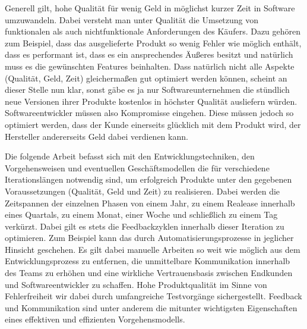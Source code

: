 Generell gilt, hohe Qualität für wenig Geld in möglichst kurzer Zeit in
Software umzuwandeln. Dabei versteht man unter Qualität die Umsetzung von
funktionalen als auch nichtfunktionale Anforderungen des Käufers. Dazu gehören
zum Beispiel, dass das ausgelieferte Produkt so wenig Fehler wie möglich
enthält, dass es performant ist, dass es ein ansprechendes Äußeres besitzt und
natürlich muss es die gewünschten Features beinhalten. Dass natürlich nicht
alle Aspekte (Qualität, Geld, Zeit) gleichermaßen gut optimiert werden können,
scheint an dieser Stelle nun klar, sonst gäbe es ja nur Softwareunternehmen
die stündlich neue Versionen ihrer Produkte kostenlos in höchster Qualität
ausliefern würden. Softwareentwickler müssen also Kompromisse eingehen. Diese
müssen jedoch so optimiert werden, dass der Kunde einerseits glücklich mit dem
Produkt wird, der Hersteller andererseits Geld dabei verdienen kann.

Die folgende Arbeit befasst sich mit den Entwicklungstechniken, den
Vorgehensweisen und eventuellen Geschäftsmodellen die für verschiedene
Iterationslängen notwendig sind, um erfolgreich Produkte unter den gegebenen
Voraussetzungen (Qualität, Geld und Zeit) zu realisieren. Dabei werden die
Zeitspannen der einzelnen Phasen von einem Jahr, zu einem Realease innerhalb
eines Quartals, zu einem Monat, einer Woche und schließlich zu einem Tag
verkürzt. Dabei gilt es stets die Feedbackzyklen innerhalb dieser Iteration zu
optimieren. Zum Beispiel kann das durch Automatisierungsprozesse in jeglicher
Hinsicht geschehen. Es gilt dabei manuelle Arbeiten so weit wie möglich aus
dem Entwicklungsprozess zu entfernen, die unmittelbare Kommunikation innerhalb
des Teams zu erhöhen und eine wirkliche Vertrauensbasis zwischen Endkunden und
Softwareentwickler zu schaffen. Hohe Produktqualität im Sinne von
Fehlerfreiheit wir dabei durch umfangreiche Testvorgänge sichergestellt.
Feedback und Kommunikation sind unter anderem die mitunter wichtigsten
Eigenschaften eines effektiven und effizienten Vorgehensmodells.
